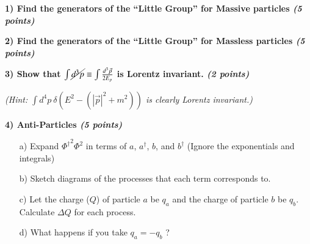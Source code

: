 {\large
\textbf{1) Find the generators of the ``Little Group'' for Massive particles \hfill \textit{(5 points)}}


\vspace*{0.25in}

\textbf{2) Find the generators of the ``Little Group'' for Massless particles \hfill \textit{(5 points)}}


\vspace*{0.25in}

\textbf{3) Show that $\int \cancel{d^3p} \equiv \int \frac{d^3\vec{p}}{2E_p}$ is Lorentz invariant. \hfill \textit{(2 points)}}

\textit{ (Hint: $\int d^4p\ \delta(E^2 - (|\vec{p}|^2 + m^2))$ is clearly Lorentz invariant.)}

\vspace*{0.25in}

\textbf{4) Anti-Particles  \hfill \textit{(5 points)}}
\begin{itemize}
\item[a)] {Expand ${\Phi^\dagger}^2 \Phi^2$  in terms of $a$, $a^\dagger$, $b$, and $b^\dagger$  (Ignore the exponentials and integrals)}
\item[b)] {Sketch diagrams of the processes that each term corresponds to.}
\item[c)] {Let the charge ($Q$) of particle $a$ be $q_a$ and the charge of particle $b$ be $q_b$.  Calculate $\Delta Q$ for each process. }
\item[d)] {What happens if you take $q_a = -q_b$ ?}
\end{itemize}





}



